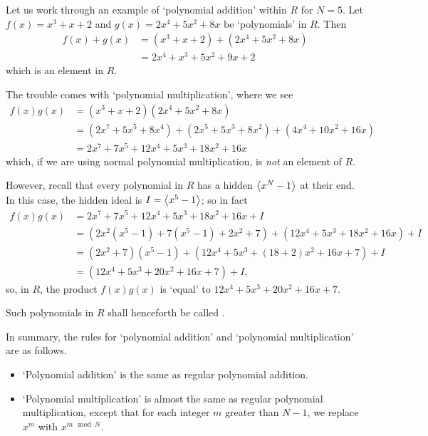 \begin{example}
    Let us work through an example of `polynomial addition' within $R$ for $N = 5$. Let $f(x) = x^3 + x + 2$ and $g(x) = 2x^4 + 5x^2 + 8x$ be `polynomials' in $R$. Then
    \begin{align*}
        f(x) + g(x) &= (x^3 + x + 2) + (2x^4 + 5x^2 + 8x)\\
        &= 2x^4 + x^3 + 5x^2 + 9x + 2
    \end{align*}
    which is an element in $R$.

    The trouble comes with `polynomial multiplication', where we see
    \begin{align*}
        f(x)g(x) &= (x^3 + x + 2)(2x^4 + 5x^2 + 8x)\\
        &= (2x^7 + 5x^5 + 8x^4) + (2x^5 + 5x^3 + 8x^2) + (4x^4 + 10x^2 + 16x)\\
        &= 2x^7 + 7x^5 + 12x^4 + 5x^3 + 18x^2 + 16x
    \end{align*}
    which, if we are using normal polynomial multiplication, is \textit{not} an element of $R$.

    However, recall that every polynomial in $R$ has a hidden $\left\langle x^N - 1\right\rangle$ at their end. In this case, the hidden ideal is $I = \left\langle x^5-1\right\rangle$; so in fact
    \begin{align*}
        f(x)g(x) &= 2x^7 + 7x^5 + 12x^4 + 5x^3 + 18x^2 + 16x + I\\
        &= (2x^2(x^5-1) + 7(x^5-1) + 2x^2 + 7) + (12x^4 + 5x^3 + 18x^2 + 16x) + I\\
        &= (2x^2+7)(x^5-1) + (12x^4 + 5x^3 + (18 + 2)x^2 + 16x + 7) + I\\
        &= (12x^4 + 5x^3 + 20x^2 + 16x + 7) + I,
    \end{align*}
    so, in $R$, the product $f(x)g(x)$ is `equal' to $12x^4 + 5x^3 + 20x^2 + 16x + 7$.
\end{example}

Such polynomials in $R$ shall henceforth be called .

In summary, the rules for `polynomial addition' and `polynomial multiplication' are as follows.
\begin{itemize}
    \item `Polynomial addition' is the same as regular polynomial addition.
    \item `Polynomial multiplication' is almost the same as regular polynomial multiplication, except that for each integer $m$ greater than $N - 1$, we replace $x^m$ with $x^{m \mod N}$.
\end{itemize}

